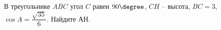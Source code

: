 \begin{ex}
	\begin{condition}
		В треугольнике \( ABC \) угол \( C \) равен \( 90 \degree \), \( CH \) – высота, \( BC=3 \),  \( \cos A =\dfrac{\sqrt{35}}{6} \). Найдите \( АН \).
	\end{condition}
\end{ex}